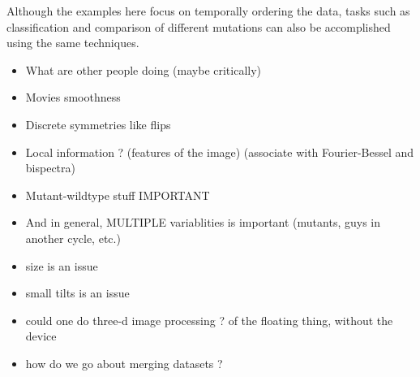 \documentclass{pnastwo}
\begin{document}
\begin{article}
Although the examples here focus on temporally ordering the data, tasks such as classification and comparison of different mutations can also be accomplished using the same techniques. 
%

\begin{itemize}
\item What are other people doing  (maybe critically)
\item Movies  smoothness
\item Discrete symmetries like flips
\item Local information ? (features of the image) (associate with Fourier-Bessel and bispectra)
\item Mutant-wildtype stuff  IMPORTANT
\item And in general, MULTIPLE variablities is important (mutants, guys in another cycle, etc.)
 
\item size is an issue
\item  small tilts is an issue
\item   could one do three-d image processing ?  of the floating thing, without the device
\item how do we go about merging datasets ?
\end{itemize}






\end{article}
\end{document}
